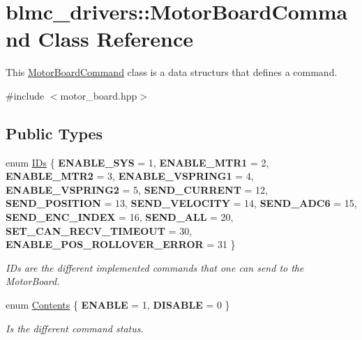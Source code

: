 \hypertarget{classblmc__drivers_1_1MotorBoardCommand}{}\section{blmc\+\_\+drivers\+:\+:Motor\+Board\+Command Class Reference}
\label{classblmc__drivers_1_1MotorBoardCommand}


This \hyperlink{classblmc__drivers_1_1MotorBoardCommand}{Motor\+Board\+Command} class is a data structurs that defines a command.  




{\ttfamily \#include $<$motor\+\_\+board.\+hpp$>$}

\subsection*{Public Types}
\begin{DoxyCompactItemize}
\item 
\mbox{\label{classblmc__drivers_1_1MotorBoardCommand_abdbd6eb70164938ea91ae02000ccf7b2}} 
enum \hyperlink{classblmc__drivers_1_1MotorBoardCommand_abdbd6eb70164938ea91ae02000ccf7b2}{I\+Ds} \{ \newline
{\bfseries E\+N\+A\+B\+L\+E\+\_\+\+S\+YS} = 1, 
{\bfseries E\+N\+A\+B\+L\+E\+\_\+\+M\+T\+R1} = 2, 
{\bfseries E\+N\+A\+B\+L\+E\+\_\+\+M\+T\+R2} = 3, 
{\bfseries E\+N\+A\+B\+L\+E\+\_\+\+V\+S\+P\+R\+I\+N\+G1} = 4, 
\newline
{\bfseries E\+N\+A\+B\+L\+E\+\_\+\+V\+S\+P\+R\+I\+N\+G2} = 5, 
{\bfseries S\+E\+N\+D\+\_\+\+C\+U\+R\+R\+E\+NT} = 12, 
{\bfseries S\+E\+N\+D\+\_\+\+P\+O\+S\+I\+T\+I\+ON} = 13, 
{\bfseries S\+E\+N\+D\+\_\+\+V\+E\+L\+O\+C\+I\+TY} = 14, 
\newline
{\bfseries S\+E\+N\+D\+\_\+\+A\+D\+C6} = 15, 
{\bfseries S\+E\+N\+D\+\_\+\+E\+N\+C\+\_\+\+I\+N\+D\+EX} = 16, 
{\bfseries S\+E\+N\+D\+\_\+\+A\+LL} = 20, 
{\bfseries S\+E\+T\+\_\+\+C\+A\+N\+\_\+\+R\+E\+C\+V\+\_\+\+T\+I\+M\+E\+O\+UT} = 30, 
\newline
{\bfseries E\+N\+A\+B\+L\+E\+\_\+\+P\+O\+S\+\_\+\+R\+O\+L\+L\+O\+V\+E\+R\+\_\+\+E\+R\+R\+OR} = 31
 \}\begin{DoxyCompactList}\small\item\em I\+Ds are the different implemented commands that one can send to the Motor\+Board. \end{DoxyCompactList}
\item 
\mbox{\label{classblmc__drivers_1_1MotorBoardCommand_ad61acf8dcb8f6fcb382fc5cbc1e44615}} 
enum \hyperlink{classblmc__drivers_1_1MotorBoardCommand_ad61acf8dcb8f6fcb382fc5cbc1e44615}{Contents} \{ {\bfseries E\+N\+A\+B\+LE} = 1, 
{\bfseries D\+I\+S\+A\+B\+LE} = 0
 \}\begin{DoxyCompactList}\small\item\em Is the different command status. \end{DoxyCompactList}
\end{DoxyCompactItemize}
